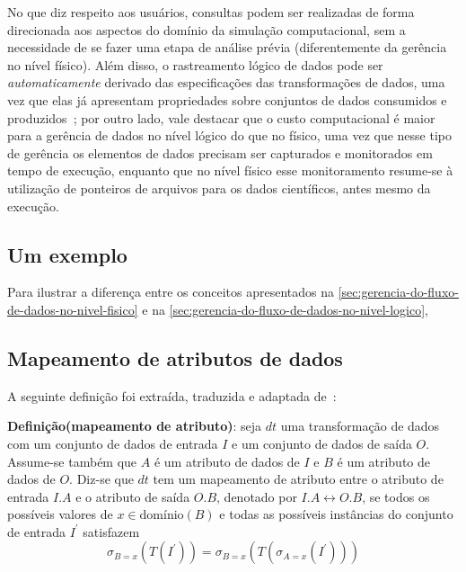 No que diz respeito aos usuários, consultas podem ser realizadas de forma direcionada aos aspectos do domínio da simulação computacional, sem a necessidade de se fazer uma etapa de análise prévia (diferentemente da gerência no nível físico). Além disso, o rastreamento lógico de dados pode ser \emph{automaticamente} derivado das especificações das transformações de dados, uma vez que elas já apresentam propriedades sobre conjuntos de dados consumidos e produzidos~\cite{ikeda2013logical,silva2017raw}; por outro lado, vale destacar que o custo computacional é maior para a gerência de dados no nível lógico do que no físico, uma vez que nesse tipo de gerência os elementos de dados precisam ser capturados e monitorados em tempo de execução, enquanto que no nível físico esse monitoramento resume-se à utilização de ponteiros de arquivos para os dados científicos, antes mesmo da execução.

\subsection{Um exemplo}

Para ilustrar a diferença entre os conceitos apresentados na \autoref{sec:gerencia-do-fluxo-de-dados-no-nivel-fisico} e na \autoref{sec:gerencia-do-fluxo-de-dados-no-nivel-logico}, 



\subsection{Mapeamento de atributos de dados}

A seguinte definição foi extraída, traduzida e adaptada de~\cite{ikeda2013logical}:

\textbf{Definição(mapeamento de atributo)}: seja \( dt \) uma transformação de dados com um conjunto de dados de entrada \( I \) e um conjunto de dados de saída \( O \). Assume-se também que \( A \) é um atributo de dados de \( I \) e \( B \) é um atributo de dados de \( O \). Diz-se que \( dt \) tem um mapeamento de atributo entre o atributo de entrada \( I.A \) e o atributo de saída \( O.B \), denotado por \( I.A \leftrightarrow O.B \), se todos os possíveis valores de \( x \in \textrm{domínio}(B) \) e todas as possíveis instâncias do conjunto de entrada \( I^{\prime} \) satisfazem
\[ \sigma_{B=x}(T(I^{\prime})) = \sigma_{B=x}(T(\sigma_{A=x}(I^{\prime}))) \]

